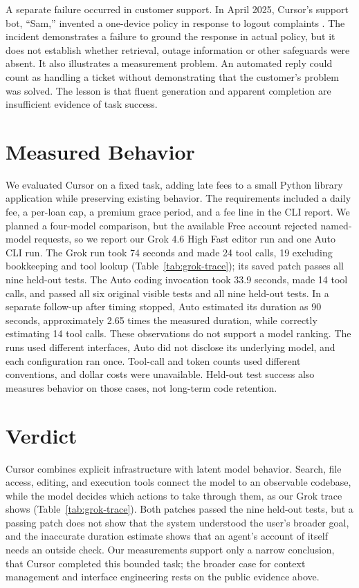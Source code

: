 \documentclass[11pt]{article}
\begin{document}
A separate failure occurred in customer support. In April 2025, Cursor's support bot, ``Sam,'' invented a one-device policy in response to logout complaints \citep{fortune2025sam}. The incident demonstrates a failure to ground the response in actual policy, but it does not establish whether retrieval, outage information or other safeguards were absent. It also illustrates a measurement problem. An automated reply could count as handling a ticket without demonstrating that the customer's problem was solved. The lesson is that fluent generation and apparent completion are insufficient evidence of task success.

\section{Measured Behavior}

We evaluated Cursor on a fixed task, adding late fees to a small Python library application while preserving existing behavior. The requirements included a daily fee, a per-loan cap, a premium grace period, and a fee line in the CLI report. We planned a four-model comparison, but the available Free account rejected named-model requests, so we report our Grok 4.6 High Fast editor run and one Auto CLI run. The Grok run took 74 seconds and made 24 tool calls, 19 excluding bookkeeping and tool lookup (Table~\ref{tab:grok-trace}); its saved patch passes all nine held-out tests. The Auto coding invocation took 33.9 seconds, made 14 tool calls, and passed all six original visible tests and all nine held-out tests. In a separate follow-up after timing stopped, Auto estimated its duration as 90 seconds, approximately 2.65 times the measured duration, while correctly estimating 14 tool calls. These observations do not support a model ranking. The runs used different interfaces, Auto did not disclose its underlying model, and each configuration ran once. Tool-call and token counts used different conventions, and dollar costs were unavailable. Held-out test success also measures behavior on those cases, not long-term code retention.

\section{Verdict}

Cursor combines explicit infrastructure with latent model behavior. Search, file access, editing, and execution tools connect the model to an observable codebase, while the model decides which actions to take through them, as our Grok trace shows (Table~\ref{tab:grok-trace}). Both patches passed the nine held-out tests, but a passing patch does not show that the system understood the user's broader goal, and the inaccurate duration estimate shows that an agent's account of itself needs an outside check. Our measurements support only a narrow conclusion, that Cursor completed this bounded task; the broader case for context management and interface engineering rests on the public evidence above.

\clearpage

\end{document}
